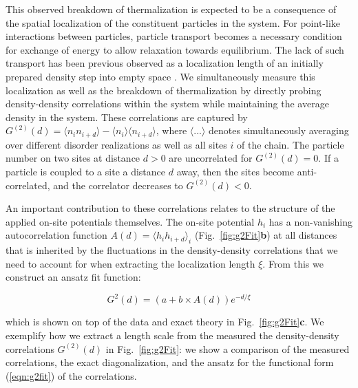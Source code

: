 This observed breakdown of thermalization is expected to be a consequence of the spatial localization of the constituent particles in the system. For point-like interactions between particles, particle transport becomes a necessary condition for exchange of energy to allow relaxation towards equilibrium. The lack of such transport has been previous observed as a localization length of an initially prepared density step into empty space \cite{Choi2016}. We simultaneously measure this localization as well as the breakdown of thermalization by directly probing density-density correlations within the system while maintaining the average density in the system. These correlations are captured by $G^{(2)}(d) = \langle n_i n_{i+d} \rangle - \langle n_i \rangle \langle n_{i+d} \rangle$, where $\langle ... \rangle$ denotes simultaneously averaging over different disorder realizations as well as all sites $i$ of the chain. The particle number on two sites at distance $d>0$ are uncorrelated for $G^{(2)}(d) = 0$. If a particle is coupled to a site a distance $d$ away, then the sites become anti-correlated, and the correlator decreases to $G^{(2)}(d)<0$.

An important contribution to these correlations relates to the structure of the applied on-site potentials themselves. The on-site potential $h_i$ has a non-vanishing autocorrelation function $A(d)=\langle h_i h_{i+d} \rangle_i $ (Fig.~\ref{fig:g2Fit}\textbf{b}) at all distances that is inherited by the fluctuations in the density-density correlations that we need to account for when extracting the localization length $\xi$. From this we construct an ansatz fit function:

\begin{equation}
\label{eqn:g2fit}
G^2(d)= (a + b\times A(d))e^{-d/\xi}
\end{equation}

 which is shown on top of the data and exact theory in Fig.~\ref{fig:g2Fit}\textbf{c}. We exemplify how we extract a length scale from the measured the density-density correlations $G^{(2)}(d)$ in Fig.~\ref{fig:g2Fit}: we show a comparison of the measured correlations, the exact diagonalization, and the ansatz for the functional form (\ref{eqn:g2fit}) of the correlations.

